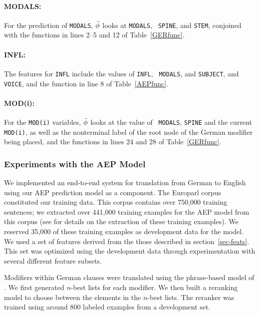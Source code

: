 \documentclass[10pt]{report}
\theoremstyle{plain}
\begin{document}
{\paragraph{MODALS:} 
For the prediction of {\tt MODALS}, $\bar{\phi}$ looks at {\tt MODALS}, {\tt
SPINE}, and {\tt STEM}, conjoined with the functions in lines 2--5 and
12 of Table~\ref{GERfunc}.

\paragraph{INFL:} 
The features for {\tt INFL} include the values of {\tt INFL}, {\tt
MODALS}, and {\tt SUBJECT}, and {\tt VOICE}, and the function in line
8 of Table~\ref{AEPfunc}.

\paragraph{MOD(i):} 
For the {\tt MOD(i)} variables, $\bar{\phi}$ looks at the value of {\tt
MODALS}, {\tt SPINE} and the current {\tt MOD(i)}, as well as the
nonterminal label of the root node of the German modifier being
placed, and the functions in lines 24 and 28 of Table~\ref{GERfunc}.

\subsubsection{Experiments with the AEP Model}
We implemented an end-to-end system for translation from German to
English using our AEP prediction model as a component. The Europarl
corpus  constituted our training data. This corpus
contains over 750,000 training sentences; we extracted over 441,000
training examples for the AEP model from this corpus (see
 for details on the extraction of these training
examples). We reserved 35,000 of these training examples as
development data for the model. We used a set of features derived from
the those described in section~\ref{sec-feats}. This set was optimized
using the development data through experimentation with several
different feature subsets.

Modifiers within German clauses were translated using the phrase-based
model of . We first generated $n$-best
lists for each modifier. We then built a reranking model to choose
between the elements in the $n$-best lists. The reranker was trained
using around 800 labeled examples from a development set.

}
\end{document}
